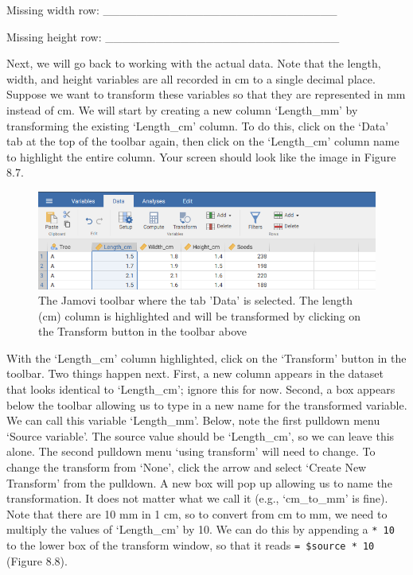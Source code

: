\documentclass[
]{scrbook}
\begin{document}
Missing width row: \_\_\_\_\_\_\_\_\_\_\_\_\_\_\_\_\_\_\_\_\_\_\_\_\_\_\_\_

Missing height row: \_\_\_\_\_\_\_\_\_\_\_\_\_\_\_\_\_\_\_\_\_\_\_\_\_\_\_\_

Next, we will go back to working with the actual data.
Note that the length, width, and height variables are all recorded in cm to a single decimal place.
Suppose we want to transform these variables so that they are represented in mm instead of cm.
We will start by creating a new column `Length\_mm' by transforming the existing `Length\_cm' column.
To do this, click on the `Data' tab at the top of the toolbar again, then click on the `Length\_cm' column name to highlight the entire column.
Your screen should look like the image in Figure 8.7.

\begin{figure}
\includegraphics[width=1\linewidth]{img/jamovi_transform_fig_length} \caption{The Jamovi toolbar where the tab 'Data' is selected. The length (cm) column is highlighted and will be transformed by clicking on the Transform button in the toolbar above}\label{fig:unnamed-chunk-31}
\end{figure}

With the `Length\_cm' column highlighted, click on the `Transform' button in the toolbar.
Two things happen next.
First, a new column appears in the dataset that looks identical to `Length\_cm'; ignore this for now.
Second, a box appears below the toolbar allowing us to type in a new name for the transformed variable.
We can call this variable `Length\_mm'.
Below, note the first pulldown menu `Source variable'.
The source value should be `Length\_cm', so we can leave this alone.
The second pulldown menu `using transform' will need to change.
To change the transform from `None', click the arrow and select `Create New Transform' from the pulldown.
A new box will pop up allowing us to name the transformation.
It does not matter what we call it (e.g., `cm\_to\_mm' is fine).
Note that there are 10 mm in 1 cm, so to convert from cm to mm, we need to multiply the values of `Length\_cm' by 10.
We can do this by appending a \texttt{*\ 10} to the lower box of the transform window, so that it reads \texttt{=\ \$source\ *\ 10} (Figure 8.8).
\end{document}
